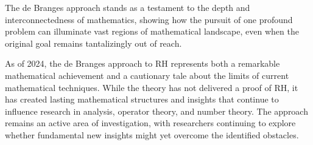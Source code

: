The de Branges approach stands as a testament to the depth and interconnectedness of mathematics, showing how the pursuit of one profound problem can illuminate vast regions of mathematical landscape, even when the original goal remains tantalizingly out of reach.

\begin{remark}
As of 2024, the de Branges approach to RH represents both a remarkable mathematical achievement and a cautionary tale about the limits of current mathematical techniques. While the theory has not delivered a proof of RH, it has created lasting mathematical structures and insights that continue to influence research in analysis, operator theory, and number theory. The approach remains an active area of investigation, with researchers continuing to explore whether fundamental new insights might yet overcome the identified obstacles.
\end{remark}